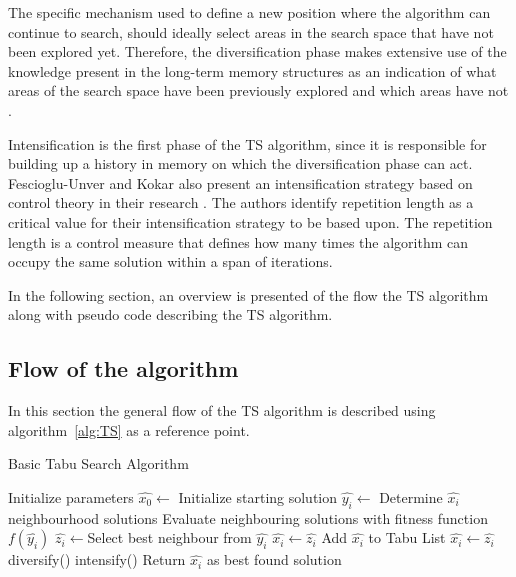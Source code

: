 The specific mechanism used to define a new position where the algorithm can continue to search, should ideally select areas in the search space that have not been explored yet\cite{NonlinearGlobalTabu,SelfControllingReactiveTabu}. Therefore, the diversification phase makes extensive use of the knowledge present in the long-term memory structures as an indication of what areas of the search space have been previously explored and which areas have not \cite{NonlinearGlobalTabu,SelfControllingReactiveTabu}.

Intensification is the first phase of the \gls{TS} algorithm, since it is responsible for building up a history in memory on which the diversification phase can act. Fescioglu-Unver and Kokar also present an intensification strategy based on control theory in their research \cite{SelfControllingReactiveTabu}. The authors identify repetition length as a critical value for their intensification strategy to be based upon. The repetition length is a control measure that defines how many times the algorithm can occupy the same solution within a span of iterations.

In the following section, an overview is presented of the flow the \gls{TS} algorithm along with pseudo code describing the \gls{TS} algorithm.
\subsection{Flow of the algorithm}
In this section the general flow of the \gls{TS} algorithm is described using algorithm~\ref{alg:TS} as a reference point.
\begin{algorithm}[H]
\caption{Basic Tabu Search Algorithm\cite{TabuRCAProblem,TabuMontemanniSmith}}
\label{alg:TS}
	\begin{algorithmic}[1]
		\State Initialize parameters
    \State $\hat{x_0} \leftarrow$ Initialize starting solution
    \State $\hat{y_i} \leftarrow$ Determine $\hat{x_i}$ neighbourhood solutions 
    \State Evaluate neighbouring solutions with fitness function $f(\hat{y_i})$
    \State $\hat{z_i} \leftarrow$Select best neighbour from $\hat{y_i}$
    \State $\hat{x_i} \leftarrow \hat{z_i}$
				\EndIf
			\Else
      \State Add $\hat{x_i}$ to Tabu List
      \State $\hat{x_i} \leftarrow \hat{z_i}$
					\State diversify()
				\Else
					\State intensify()
				\EndIf
			\EndIf
		\EndWhile
    \State Return $\hat{x_i}$ as best found solution
	\end{algorithmic}
\end{algorithm}

